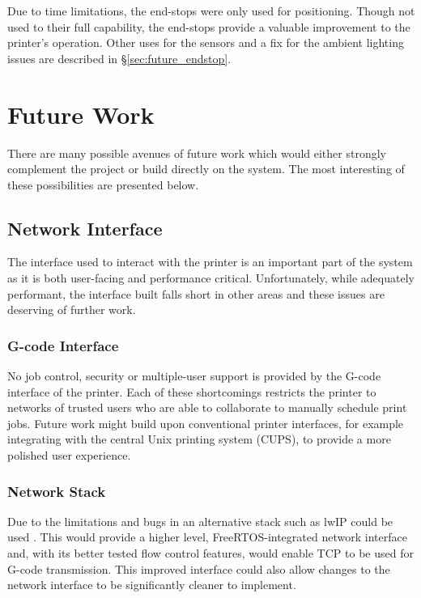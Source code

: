 			Due to time limitations, the end-stops were only used for positioning.
			Though not used to their full capability, the end-stops provide a valuable
			improvement to the printer's operation.  Other uses for the sensors and a
			fix for the ambient lighting issues are described in
			\S\ref{sec:future_endstop}.
		
	\section{Future Work}
		
		There are many possible avenues of future work which would either strongly
		complement the project or build directly on the system. The most interesting
		of these possibilities are presented below.
		
		\subsection{Network Interface}
			
			\label{sec:future_network}
			
			The interface used to interact with the printer is an important part of
			the system as it is both user-facing and performance critical.
			Unfortunately, while adequately performant, the interface built falls
			short in other areas and these issues are deserving of further work.
			
			\subsubsection{G-code Interface}
				
				No job control, security or multiple-user support is provided by the
				G-code interface of the printer. Each of these shortcomings restricts
				the printer to networks of trusted users who are able to collaborate to
				manually schedule print jobs. Future work might build upon conventional
				printer interfaces, for example integrating with the central Unix
				printing system (CUPS), to provide a more polished user experience.
			
			\subsubsection{Network Stack}
				
				Due to the limitations and bugs in \uIP{} an alternative stack such as
				lwIP could be used \cite{lwip}. This would provide a higher level,
				FreeRTOS-integrated network interface and, with its better tested flow
				control features, would enable TCP to be used for G-code transmission.
				This improved interface could also allow changes to the network
				interface to be significantly cleaner to implement.
			
